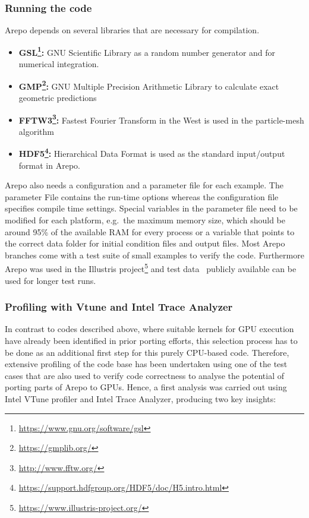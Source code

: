 \documentclass[../main]{subfiles}
\begin{document}
\subsubsection{Running the code}
Arepo depends on several libraries that are necessary for compilation.
\begin{itemize}
	\item{\textbf{GSL\footnote{\url{https://www.gnu.org/software/gsl}}:}} GNU Scientific Library as a random number generator and for numerical integration.
	\item{\textbf{GMP\footnote{\url{https://gmplib.org/}}:}} GNU Multiple Precision Arithmetic Library to calculate exact geometric predictions
	\item{\textbf{FFTW3\footnote{\url{http://www.fftw.org/}}:}} Fastest Fourier Transform in the West is used in the particle-mesh algorithm
	\item{\textbf{HDF5\footnote{\url{https://support.hdfgroup.org/HDF5/doc/H5.intro.html}}:}} Hierarchical Data Format is used as the standard input/output format in Arepo.
\end{itemize}
Arepo also needs a configuration and a parameter file for each example.
The parameter File contains the run-time options whereas the configuration file specifies compile time settings.
Special variables in the parameter file need to be modified for each platform, e.g.\ the maximum memory size, which should be around 95\% of the available RAM for every process or a variable that points to the correct data folder for initial condition files and output files.
Most Arepo branches come with a test suite of small examples to verify the code.
Furthermore Arepo was used in the Illustris project\footnote{\url{https://www.illustris-project.org/}} and test data~\cite{Nelson_2015} publicly available can be used for longer test runs.

\subsubsection{Profiling with Vtune and Intel Trace Analyzer}
In contrast to codes described above, where suitable kernels for GPU execution have already been identified in prior porting efforts, this selection process has to be done as an additional first step for this purely CPU-based code.
Therefore, extensive profiling of the code base has been undertaken using one of the test cases that are also used to verify code correctness to analyse the potential of porting parts of Arepo to GPUs.
Hence, a first analysis was carried out using Intel VTune profiler and Intel Trace Analyzer, producing two key insights:
\end{document}
